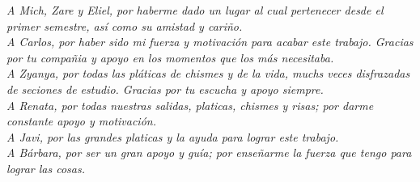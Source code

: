 \textit{A Mich, Zare y Eliel, por haberme dado un lugar al cual pertenecer desde
el primer semestre, as\'i como su amistad y cari\~{n}o.}\\

\textit{A Carlos, por haber sido mi fuerza y motivaci\'on para acabar este
trabajo. Gracias por tu compa\~{n}ia y apoyo en los momentos que los m\'as
necesitaba.}\\

\textit{A Zyanya, por todas las pl\'aticas de chismes y de la vida, muchs veces
disfrazadas de seciones de estudio. Gracias por tu escucha y apoyo siempre.}\\

\textit{A Renata, por todas nuestras salidas, platicas, chismes y risas; por
darme constante apoyo y motivaci\'on.}\\

\textit{A Javi, por las grandes platicas y la ayuda para lograr este trabajo.}\\

\textit{A B\'arbara, por ser un gran apoyo y gu\'ia; por ense\~{n}arme la fuerza
que tengo para lograr las cosas.}\\